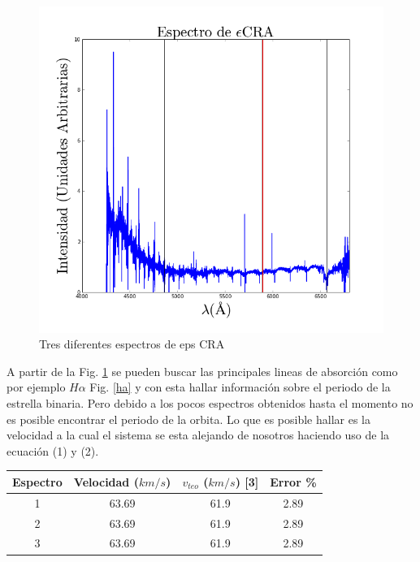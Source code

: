 \documentclass[Proceedings]{ascelike}
\begin{document}
\begin{figure}
\includegraphics[scale=0.33]{Espectro3.png}
\caption{Tres diferentes espectros de eps CRA\label{eps}}
\end{figure}

A partir de la Fig. \ref{eps} se pueden buscar las principales lineas de absorci\'on como por ejemplo $H\alpha$
Fig. \ref{ha} y con esta hallar informaci\'on sobre el periodo de la estrella binaria. Pero debido a los pocos espectros obtenidos hasta el momento no es posible encontrar el periodo de la orbita. Lo que es posible hallar es la velocidad a la cual el sistema se esta alejando de nosotros haciendo uso de la ecuaci\'on (1) y (2).\\

\begin{tabular}{c c c c}
\hline
Espectro & Velocidad ($km/s$) & $v_{teo}$ ($km/s$) [3]& Error \%  \\
\hline
1 & 63.69 & 61.9 & 2.89\\
2 & 63.69 & 61.9 & 2.89 \\
3 & 63.69 & 61.9 & 2.89\\
\hline
\end{tabular}
\end{document}
